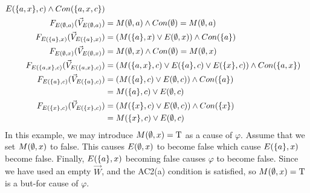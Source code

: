 \begin{example}
\begin{align*}
        E(\{a,x\},c) \wedge Con(\{a,x,c\})                    \\
        F_{E(\emptyset,a)}(\vec V_{E(\emptyset,a)})      & = M(\emptyset,a) \wedge Con(\emptyset) = M(\emptyset,a) \\
        F_{E(\{a\},x)}(\vec V_{E(\{a\},x)})   & = (M(\{a\},x) \vee E(\emptyset,x) )
        \wedge Con(\{a\})                                     \\
        F_{E(\emptyset,x)}(\vec V_{E(\emptyset,x)})      & = M(\emptyset,x) \wedge Con(\emptyset) = M(\emptyset,x) \\
        F_{E(\{a,x\},c)}(\vec V_{E(\{a,x\},c)}) & = (M(\{a,x\},c) \vee E(\{a\},c)
        \vee E(\{x\},c)) \wedge Con(\{a,x\})                  \\
        F_{E(\{a\},c)}(\vec V_{E(\{a\},c)})   & = (M(\{a\},c) \vee E(\emptyset,c))
        \wedge Con(\{a\})                                     \\
                         & = M(\{a\},c) \vee E(\emptyset,c)          \\
        F_{E(\{x\},c)}(\vec V_{E(\{x\},c)})   & = (M(\{x\},c) \vee E(\emptyset,c))
        \wedge Con(\{x\})                                     \\
                         & = M(\{x\},c) \vee E(\emptyset,c)          \\
    \end{align*}
    In this example, we may introduce $M(\emptyset,x) = \mathrm{T}$ as a cause of $\varphi$.
    Assume that we set $M(\emptyset,x)$ to false.
    This causes $E(\emptyset,x)$ to become false which cause $E(\{a\},x)$ become false.
    Finally, $E(\{a\},x)$ becoming false causes $\varphi$ to become false.
    Since we have used an empty $\vec W$, and the AC2(a) condition is
    satisfied, so $M(\emptyset,x) = \mathrm{T}$ is a but-for cause of $\varphi$.
\end{example}
